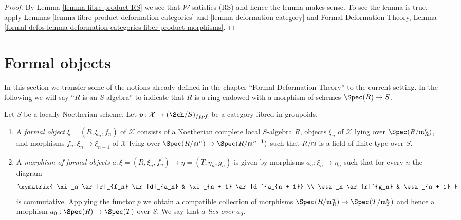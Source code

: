 \begin{proof}
By Lemma \ref{lemma-fibre-product-RS} we see that $\mathcal{W}$
satisfies (RS) and hence the lemma makes sense. To see the lemma
is true, apply Lemmas \ref{lemma-fibre-product-deformation-categories} and
\ref{lemma-deformation-category}
and Formal Deformation Theory, Lemma
\ref{formal-defos-lemma-deformation-categories-fiber-product-morphisms}.
\end{proof}






\section{Formal objects}
\label{section-formal-objects}

\noindent
In this section we transfer some of the notions already defined
in the chapter ``Formal Deformation Theory'' to the current setting.
In the following we will say ``$R$ is an $S$-algebra'' to indicate
that $R$ is a ring endowed with a morphism of schemes $\Spec(R) \to S$.

\begin{definition}
\label{definition-formal-objects}
Let $S$ be a locally Noetherian scheme. Let
$p : \mathcal{X} \to (\Sch/S)_{fppf}$ be a category fibred in groupoids.
\begin{enumerate}
\item A {\it formal object} $\xi = (R, \xi_n, f_n)$ of $\mathcal{X}$ consists
of a Noetherian complete local $S$-algebra $R$, objects $\xi_n$ of
$\mathcal{X}$ lying over $\Spec(R/\mathfrak m_R^n)$, and morphisms
$f_n : \xi_n \to \xi_{n + 1}$ of $\mathcal{X}$ lying over
$\Spec(R/\mathfrak m^n) \to \Spec(R/\mathfrak m^{n + 1})$
such that $R/\mathfrak m$ is a field of finite type over $S$.
\item A {\it morphism of formal objects}
$a : \xi = (R, \xi_n, f_n) \to \eta = (T, \eta_n, g_n)$
is given by morphisms $a_n : \xi_n \to \eta_n$ such that for every $n$
the diagram
$$
\xymatrix{
\xi_n \ar[r]_{f_n} \ar[d]_{a_n} & \xi_{n + 1} \ar[d]^{a_{n + 1}} \\
\eta_n \ar[r]^{g_n} & \eta_{n + 1}
}
$$
is commutative. Applying the functor $p$ we obtain a compatible collection
of morphisms $\Spec(R/\mathfrak m_R^n) \to \Spec(T/\mathfrak m_T^n)$ and
hence a morphism $a_0 : \Spec(R) \to \Spec(T)$ over $S$. We say that
$a$ {\it lies over} $a_0$.
\end{enumerate}
\end{definition}


